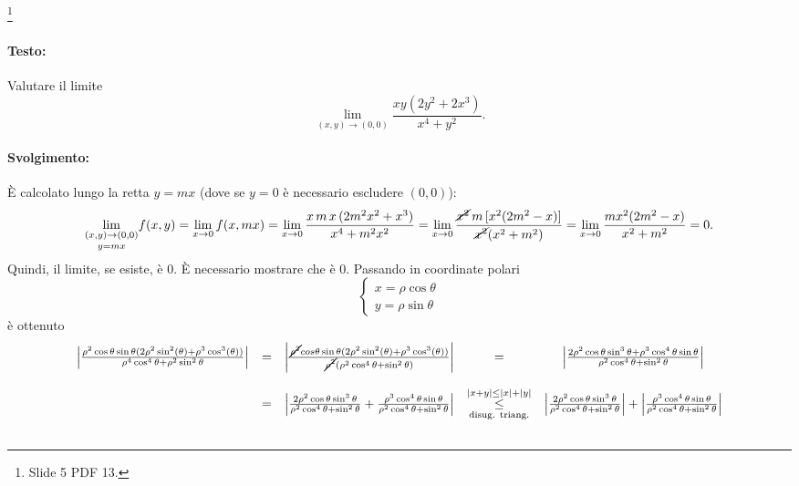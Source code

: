 \begin{example}\footnote{Slide 5 PDF 13.}
	\paragraph{Testo:} Valutare il limite
	\begin{equation*}
		\lim_{(x,y)\rightarrow(0,0)} \frac{xy(2y^2 + 2 x^3)}{x^4+y^2}.
	\end{equation*}
	\paragraph{Svolgimento:} È calcolato lungo la retta $y=mx$ (dove se $y=0$ è necessario escludere $(0,0)$):
	\begin{equation*}
		\underset{y=mx}{\lim_{(x,y)\rightarrow (0,0)}} f(x,y)=\lim_{x\rightarrow 0}f(x,mx)=\lim_{x\rightarrow 0} \frac{x\,m\,x\,(2m^2x^2+x^3)}{x^4+m^2x^2}=\lim_{x\rightarrow 0}\frac{\cancel{x^2}\,m\, [x^2(2m^2-x)]}{\cancel{x^2}(x^2+m^2)} = \lim_{x\rightarrow 0}\frac{mx^2(2m^2-x)}{x^2+m^2}=0.
	\end{equation*}
	Quindi, il limite, se esiste, è 0. È necessario mostrare che è 0. Passando in coordinate polari
	\begin{equation*}
		\begin{cases}
			x=\rho\cos\theta\\
			y=\rho\sin\theta
		\end{cases}
	\end{equation*}
	è ottenuto
	\begin{equation*}
		\begin{matrix}
			\left|\frac{\rho^2\cos\theta \sin\theta (2\rho^2\sin^2(\theta)+\rho^3\cos^3(\theta))}{\rho^4\cos^4\theta + \rho^2 \sin^2\theta}\right| &=& \left|\frac{\cancel{\rho^2}cos\theta \sin\theta (2\rho^2\sin^2(\theta)+\rho^3\cos^3(\theta))}{\cancel{\rho^2}(\rho^2\cos^4\theta + \sin^2\theta)}\right|&=& \left|\frac{2\rho^2\cos\theta\sin^3\theta + \rho^3 \cos^4\theta\sin\theta}{\rho^2 \cos^4\theta + \sin^2\theta}\right|\\\\
			&=& \left|\frac{2\rho^2\cos\theta\sin^3\theta}{\rho^2 \cos^4\theta + \sin^2\theta} + \frac{\rho^3 \cos^4\theta\sin\theta}{\rho^2 \cos^4\theta + \sin^2\theta}\right| &\overset{|x+y|\leq|x|+|y|}{\underset{\text{disug. triang.}}{\leq}}& \left|\frac{2\rho^2\cos\theta\sin^3\theta}{\rho^2 \cos^4\theta + \sin^2\theta}\right| + \left| \frac{\rho^3 \cos^4\theta\sin\theta}{\rho^2 \cos^4\theta + \sin^2\theta}\right|\\\\

\end{matrix}
\end{equation*}
\end{example}
